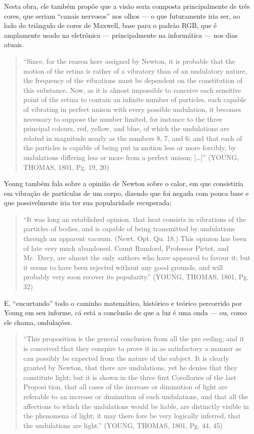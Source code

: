 \documentclass[
  a4paper]{article}
\begin{document}
Nesta obra, ele também propõe que a visão seria composta principalmente
de três cores, que seriam ``canais nervosos'' nos olhos --- o que
futuramente iria ser, ao lado do triângulo de cores de Maxwell, base
para o padrão RGB, que é amplamente usado na eletrônica ---
principalmente na informática --- nos dias atuais.

\begin{quote}
``Since, for the reason here assigned by Newton, it is probable that the
motion of the retina is rather of a vibratory than of an undulatory
nature, the frequency of the vibrations must be dependent on the
constitution of this substance. Now, as it is almost impossible to
conceive each sensitive point of the retina to contain an infinite
number of particles, each capable of vibrating in perfect unison with
every possible undulation, it becomes necessary to suppose the number
limited, for instance to the three principal colours, red, yellow, and
blue, of which the undulations are related in magnitude nearly as the
numbers 8, 7, and 6; and that each of the particles is capable of being
put in motion less or more forcibly, by undulations differing less or
more from a perfect unison; {[}\ldots{]}'' (YOUNG, THOMAS, 1801, Pg. 19,
20)
\end{quote}

Young também fala sobre a opinião de Newton sobre o calor, em que
consistiria em vibração de partículas de um corpo, dizendo que foi
negada com pouca base e que possivelmente iria ter sua popularidade
recuperada:

\begin{quote}
``It was long an established opinion, that heat consists in vibrations
of the particles of bodies, and is capable of being transmitted by
undulations through an apparent vacuum. (Newt. Opt. Qu. 18.) This
opinion has been of late very much abandoned. Count Rumford, Professor
Pictet, and Mr.~Davy, are almost the only authors who have appeared to
favour it; but it seems to have been rejected without any good grounds,
and will probably very soon recover its popularity.'' (YOUNG, THOMAS,
1801, Pg. 32)
\end{quote}

E, ``encurtando'' todo o caminho matemático, histórico e teórico
percorrido por Young em seu informe, cá está a conclusão de que a luz é
uma onda --- ou, como ele chama, ondulações.

\begin{quote}
``This proposition is the general conclusion from all the pre­ ceding;
and it is conceived that they conspire to prove it in as satisfactory a
manner as can possibly be expected from the nature of the subject. It is
clearly granted by Newton, that there are undulations, yet he denies
that they constitute light; but it is shown in the three first
Corollaries of the last Proposi­ tion, that all cases of the increase or
diminution of light are referable to an increase or diminution of such
undulations, and that all the affections to which the undulations would
be liable, are distinctly visible in the phenomena of light; it may
there­ fore be very logically inferred, that the undulations are
light.'' (YOUNG, THOMAS, 1801, Pg. 44, 45)
\end{quote}
\end{document}
